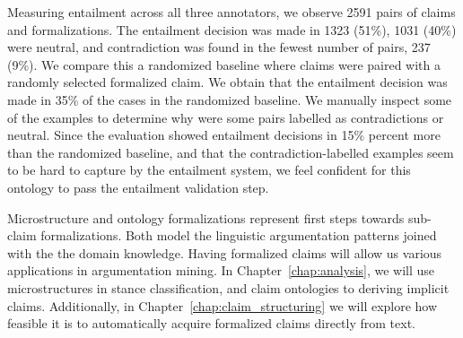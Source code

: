 Measuring entailment across all three annotators, we observe 2591 pairs of claims
and formalizations. The entailment decision was made in 1323 (51\%), 1031 (40\%)
were neutral, and contradiction was found in the fewest number of pairs, 
237 (9\%). We compare this a randomized baseline where claims were 
paired with a randomly selected formalized claim. 
We obtain that the entailment decision was made in 
35\% of the cases in the randomized baseline. 
We manually inspect some of the examples to determine why were some 
pairs labelled as contradictions or neutral. 
Since the evaluation showed entailment decisions in 
15\% percent more 
than the randomized baseline, and that the contradiction-labelled examples 
seem to be hard to capture by the entailment system, we feel confident for this ontology
to pass the entailment validation step. 

% 

Microstructure and ontology formalizations represent first steps towards
sub-claim formalizations. Both model the linguistic argumentation patterns
joined with the the domain knowledge.  Having formalized claims will allow us
various applications in argumentation mining. In Chapter~\ref{chap:analysis},
we will use microstructures in stance classification, and claim ontologies to
deriving implicit claims.  Additionally, in
Chapter~\ref{chap:claim_structuring} we will explore how feasible it is to
automatically acquire formalized claims directly from text.  
